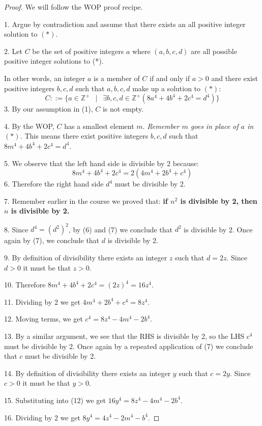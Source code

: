\documentclass[14pt]{extarticle}
\begin{document}
\begin{proof}
We will follow the WOP proof recipe.

1. Argue by contradiction and assume that there exists an all positive integer solution to $(*)$.

2. Let $C$ be the set of positive integers $a$ where $(a, b, c, d)$ are all possible positive integer solutions to (*). 

In other words, an integer $a$ is a member of $C$ if and only if $a > 0$ and there exist positive integers $b, c, d$ such that $a, b, c, d$ make up a solution to $(*)$:
$$
C::=\{a \in \mathbb{Z}^+ \,\,\, \mid \,\,\, \exists b, c, d \in \mathbb{Z}^+(8a^4 + 4b^4 + 2c^4 = d^4)\}
$$
3. By our assumption in (1), $C$ is not empty.

4. By the WOP, $C$ has a smallest element $m$. \textit{Remember $m$ goes in place of $a$ in $(*)$.} This means there exist positive integers $b, c, d$ such that $8m^4 + 4b^4 + 2c^4 = d^4$.

5. We observe that the left hand side is divisible by 2 because:
$$
8m^4 + 4b^4 + 2c^4 = 2(4m^4 + 2b^4 + c^4) 
$$
6. Therefore the right hand side $d^4$ must be divisible by 2.

7. Remember earlier in the course we proved that: \textbf{if $n^2$ is divisible by 2, then $n$ is divisible by 2.} 

8. Since $d^4 = (d^2)^2$, by (6) and (7) we conclude that $d^2$ is divisible by 2. Once again by (7), we conclude that $d$ is divisible by 2.

9. By definition of divisibility there exists an integer $z$ such that $d = 2z$. Since $d > 0$ it must be that $z > 0$.

10. Therefore $8m^4 + 4b^4 + 2c^4 = (2z)^4 = 16z^4$.

11. Dividing by 2 we get $4m^4 + 2b^4 + c^4 = 8z^4$.

12. Moving terms, we get $c^4 = 8z^4 - 4m^4 - 2b^4$.

13. By a similar argument, we see that the RHS is divisible by 2, so the LHS $c^4$ must be divisible by 2. Once again by a repeated application of (7) we conclude that $c$ must be divisible by 2.

14. By definition of divisibility there exists an integer $y$ such that $c = 2y$. Since $c > 0$ it must be that $y > 0$.

15. Substituting into (12) we get $16y^4 = 8z^4 - 4m^4 - 2b^4$.

16. Dividing by 2 we get $8y^4 = 4z^4 - 2m^4 - b^4$.


\end{proof}
\end{document}
